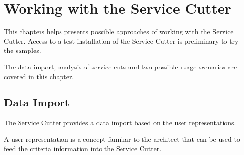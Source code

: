 \chapter{Working with the Service Cutter} 

This chapters helps presents possible approaches of working with the Service Cutter. Access to a test installation of the Service Cutter is preliminary to try the samples.

The data import, analysis of service cuts and two possible usage scenarios are covered in this chapter.









\section{Data Import}
\label{sec:dataImport}

The Service Cutter provides a data import based on the user representations.

A user representation is a concept familiar to the architect that can be used to feed the criteria information into the Service Cutter. 

